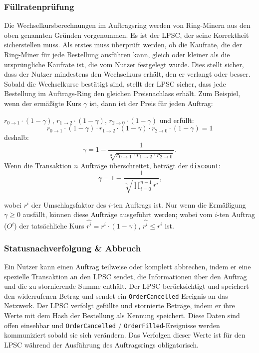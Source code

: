 \documentclass[UTF8,nofonts]{article}
\begin{document}
\begin{multicols}{2}
\subsubsection{Füllratenprüfung\label{sec:fill_rate_check}}

Die Wechselkursberechnungen im Auftragsring werden von Ring-Minern aus den oben genannten Gründen vorgenommen. Es ist der LPSC, der seine Korrektheit sicherstellen muss. Als erstes muss überprüft werden, ob die Kaufrate, die der Ring-Miner für jede Bestellung ausführen kann, gleich oder kleiner als die ursprüngliche Kaufrate ist, die vom Nutzer festgelegt wurde. Dies stellt sicher, dass der Nutzer mindestens den Wechselkurs erhält, den er verlangt oder besser. Sobald die Wechselkurse bestätigt sind, stellt der LPSC sicher, dass jede Bestellung im Auftrags-Ring den gleichen Preisnachlass erhält. Zum Beispiel, wenn der ermäßigte Kurs $\gamma$ ist, dann ist der Preis für jeden Auftrag: 

$r_{0\rightarrow 1} \cdot (1-\gamma)$, $r_{1\rightarrow 2} \cdot (1-\gamma)$, $r_{2 \rightarrow 0} \cdot (1-\gamma)$ und erfüllt:  
\begin{equation}
r_{0\rightarrow 1} \cdot (1-\gamma)\cdot r_{1\rightarrow 2} \cdot (1-\gamma) \cdot r_{2 \rightarrow 0} \cdot (1-\gamma) = 1
\end{equation}
deshalb:
\begin{equation}
\gamma = 1- \frac{1}{\sqrt[3]{r_{0\rightarrow 1} \cdot r_{1\rightarrow 2} \cdot r_{2\rightarrow 0}}}\text{.}
\end{equation}
Wenn die Transaktion $n$ Aufträge überschreitet, beträgt der \texttt{discount}: 
\begin{equation}
\gamma = 1- \frac{1}{\sqrt[n]{\prod_{i=0}^{n-1} r^i}} \text{,}
\end{equation}

wobei $r^i$ der Umschlagsfaktor des $i$-ten Auftrags ist. Nur wenn die Ermäßigung $\gamma \ge 0$ ausfällt, können diese Aufträge ausgeführt werden; wobei vom $i$-ten Auftrag ($O^i$) der tatsächliche Kurs $\hat{r^i} = r^i \cdot (1-\gamma)$, $\hat{r^i}\le r^i$ ist.


\subsubsection{Statusnachverfolgung \& Abbruch}

Ein Nutzer kann einen Auftrag teilweise oder komplett abbrechen, indem er eine spezielle Transaktion an den LPSC sendet, die Informationen über den Auftrag und die zu stornierende Summe enthält. Der LPSC berücksichtigt und speichert den widerrufenen Betrag und sendet ein \verb|OrderCancelled|-Ereignis an das Netzwerk. Der LPSC verfolgt gefüllte und stornierte Beträge, indem er ihre Werte mit dem Hash der Bestellung als Kennung speichert. Diese Daten sind offen einsehbar und \verb|OrderCancelled| / \verb|OrderFilled|-Ereignisse werden kommuniziert sobald sie sich verändern. Das Verfolgen dieser Werte ist für den LPSC während der Ausführung des Auftragsrings obligatorisch.


\end{multicols}
\end{document}
